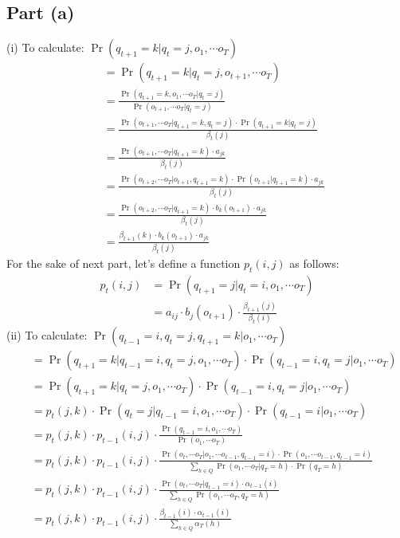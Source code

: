 \documentclass[11pt,a4paper,titlepage]{article}
\begin{document}
\subsection*{Part (a)}
(i) To calculate: $\Pr(q_{t+1} = k | q_t = j, o_1, \cdots o_T)$
\begin{align*}
    ~~ &= \Pr(q_{t+1} = k | q_t = j, o_{t+1}, \cdots o_T) \tag{Markov property} \\
       &= \frac{\Pr(q_{t+1} = k, o_1, \cdots o_T | q_t = j)}
               {\Pr(o_{t+1}, \cdots o_T | q_t = j)} \\
       &= \frac{\Pr(o_{t+1}, \cdots o_T | q_{t+1} = k, q_t = j) \cdot \Pr(q_{t+1} = k | q_t = j)}
               {\beta_t(j)} \\
       &= \frac{\Pr(o_{t+1}, \cdots o_T | q_{t+1} = k) \cdot a_{jk}}
               {\beta_t(j)} \tag{Markov prop.} \\
       &= \frac{\Pr(o_{t+2}, \cdots o_T | o_{t+1}, q_{t+1} = k) \cdot \Pr(o_{t+1} | q_{t+1} = k) \cdot a_{jk}}
               {\beta_t(j)} \\
       &= \frac{\Pr(o_{t+2}, \cdots o_T | q_{t+1} = k) \cdot b_k(o_{t+1}) \cdot a_{jk}}
               {\beta_t(j)} \tag{Markov prop.} \\
       &= \frac{\beta_{t+1}(k) \cdot b_k(o_{t+1}) \cdot a_{jk}}
               {\beta_t(j)}
\end{align*}
For the sake of next part, let's define a function $p_t(i, j)$ as follows:
\begin{align*}
    p_t(i, j) &= \Pr(q_{t+1} = j | q_t = i, o_1, \cdots o_T) \\
              &= a_{ij} \cdot b_j(o_{t+1}) \cdot \frac{\beta_{t+1}(j)}{\beta_t(i)}
\end{align*}
(ii) To calculate: $\Pr(q_{t-1} = i, q_t = j, q_{t+1} = k | o_1, \cdots o_T)$
\begin{align*}
    ~~ &= \Pr(q_{t+1} = k | q_{t-1} = i, q_t = j, o_1, \cdots o_T) \cdot \Pr(q_{t-1} = i, q_t = j | o_1, \cdots o_T) \\
       &= \Pr(q_{t+1} = k | q_t = j, o_1, \cdots o_T) \cdot \Pr(q_{t-1} = i, q_t = j | o_1, \cdots o_T) \tag{Markov prop.} \\
       &= p_t(j, k) \cdot \Pr(q_t = j | q_{t-1} = i, o_1, \cdots o_T) \cdot \Pr(q_{t-1} = i | o_1, \cdots o_T) \\
       &= p_t(j, k) \cdot p_{t-1}(i, j) \cdot \frac{\Pr(q_{t-1} = i, o_1, \cdots o_T)}{\Pr(o_1, \cdots o_T)} \\
       &= p_t(j, k) \cdot p_{t-1}(i, j) \cdot
          \frac{\Pr(o_t, \cdots o_T | o_1, \cdots o_{t-1}, q_{t-1} = i) \cdot
                \Pr(o_1, \cdots o_{t-1}, q_{t-1} = i)}
               {\sum_{h \in Q}\Pr(o_1, \cdots o_T | q_T = h) \cdot \Pr(q_T = h)} \\
       &= p_t(j, k) \cdot p_{t-1}(i, j) \cdot
          \frac{\Pr(o_t, \cdots o_T | q_{t-1} = i) \cdot \alpha_{t-1}(i)}
               {\sum_{h \in Q}\Pr(o_1, \cdots o_T, q_T = h)} \\
       &= p_t(j, k) \cdot p_{t-1}(i, j) \cdot
          \frac{\beta_{t-1}(i) \cdot \alpha_{t-1}(i)}{\sum_{h \in Q}\alpha_T(h)}
\end{align*}
\end{document}

